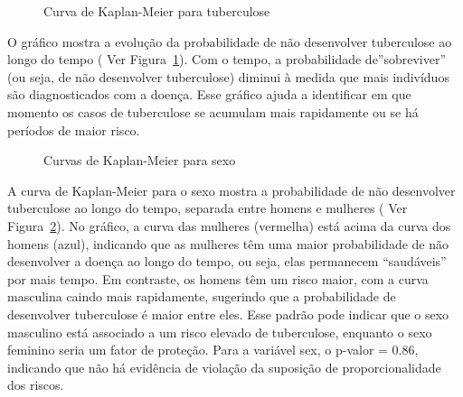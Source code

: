 \documentclass[
  letterpaper,
  DIV=11,
  numbers=noendperiod]{scrreprt}
\begin{document}
\begin{figure}

\caption{\label{fig-fig1}Curva de Kaplan-Meier para tuberculose}


\end{figure}%

O gráfico mostra a evolução da probabilidade de não desenvolver
tuberculose ao longo do tempo ( Ver Figura~\ref{fig-fig1}). Com o tempo,
a probabilidade de''sobreviver'' (ou seja, de não desenvolver
tuberculose) diminui à medida que mais indivíduos são diagnosticados com
a doença. Esse gráfico ajuda a identificar em que momento os casos de
tuberculose se acumulam mais rapidamente ou se há períodos de maior
risco.

\begin{figure}

\caption{\label{fig-fig2}Curvas de Kaplan-Meier para sexo}


\end{figure}%

A curva de Kaplan-Meier para o sexo mostra a probabilidade de não
desenvolver tuberculose ao longo do tempo, separada entre homens e
mulheres ( Ver Figura~\ref{fig-fig2}). No gráfico, a curva das mulheres
(vermelha) está acima da curva dos homens (azul), indicando que as
mulheres têm uma maior probabilidade de não desenvolver a doença ao
longo do tempo, ou seja, elas permanecem ``saudáveis'' por mais tempo.
Em contraste, os homens têm um risco maior, com a curva masculina caindo
mais rapidamente, sugerindo que a probabilidade de desenvolver
tuberculose é maior entre eles. Esse padrão pode indicar que o sexo
masculino está associado a um risco elevado de tuberculose, enquanto o
sexo feminino seria um fator de proteção. Para a variável sex, o p-valor
= 0.86, indicando que não há evidência de violação da suposição de
proporcionalidade dos riscos.
\end{document}
